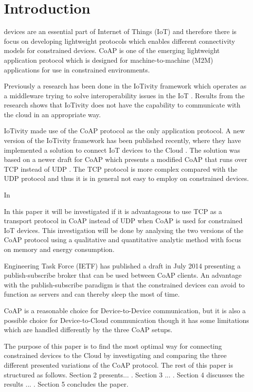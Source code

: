 \section{Introduction}
% 
% 
 devices are an essential part of Internet of Things (IoT) and therefore there is focus on developing lightweight protocols which enables different connectivity models for constrained devices.  
CoAP is one of the emerging lightweight application protocol which is designed for machine-to-machine (M2M) applications for use in constrained environments.   

Previously a research has been done in the IoTivity framework which operates as a middleware trying to solve interoperability issues in the IoT \cite{interoperabilityChallenge}. Results from the research shows that IoTivity does not have the capability to communicate with the cloud in an appropriate way. 

IoTivity made use of the CoAP protocol as the only application protocol. 
A new version of the IoTivity framework has been published recently, where they have implemented a solution to connect IoT devices to the Cloud \cite{iotivity1.1}. The solution was based on a newer draft for CoAP \cite{coapTCP} which presents a modified CoAP that runs over TCP instead of UDP \cite{coapUDP}.
The TCP protocol is more complex compared with the UDP protocol and thus it is in general not easy to employ on constrained devices.

In \cite{TCPvsUDP}

In this paper it will be investigated if it is advantageous to use TCP as a transport protocol in CoAP instead of UDP when CoAP is used for constrained IoT devices. This investigation will be done by analysing the two versions of the CoAP protocol using a qualitative and quantitative analytic method with focus on memory and energy consumption. 

Engineering Task Force (IETF) has published a draft in July 2014 presenting a publish-subscribe broker that can be used between CoAP clients. An advantage with the publish-subscribe paradigm is that the constrained devices can avoid to function as servers and can thereby sleep the most of time.

CoAP is a reasonable choice for Device-to-Device communication,  but it is also a possible choice for Device-to-Cloud communication though it has some limitations which are handled differently by the three CoAP setups.

The purpose of this paper is to find the most optimal way for connecting constrained devices to the Cloud by investigating and comparing the three different presented variations of the CoAP protocol. The rest of this paper is structured as follows.  Section 2 presents... . Section 3 ... . Section 4 discusses the results ... . Section 5 concludes the paper.     
